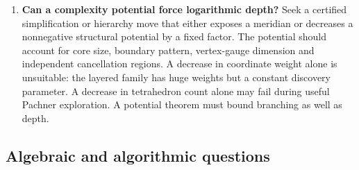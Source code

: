 \begin{enumerate}[label=G\arabic*.]
\item \textbf{Can a complexity potential force logarithmic depth?}
Seek a certified simplification or hierarchy move that either exposes a
meridian or decreases a nonnegative structural potential by a fixed
factor. The potential should account for core size, boundary pattern,
vertex-gauge dimension and independent cancellation regions. A decrease
in coordinate weight alone is unsuitable: the layered family has huge
weights but a constant discovery parameter. A decrease in tetrahedron
count alone may fail during useful Pachner exploration. A potential
theorem must bound branching as well as depth.
\end{enumerate}

\subsection{Algebraic and algorithmic questions}

